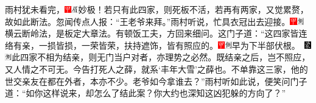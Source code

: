 雨村犹未看完，{\includegraphics[width=3mm]{../Images/00002}\includegraphics[width=3mm]{../Images/00010}\footnotesize \kaishu 妙极！若只有此四家，则死板不活，若再有两家，又觉累赘，故如此断法。}忽闻传点人报：“王老爷来拜。”雨村听说，忙具衣冠出去迎接。{\includegraphics[width=3mm]{../Images/00002}\includegraphics[width=3mm]{../Images/00011}\footnotesize \kaishu 横云断岭法，是板定大章法。}有顿饭工夫，方回来细问。这门子道：“这四家皆连络有亲，一损皆损，一荣皆荣，扶持遮饰，皆有照应的。{{\includegraphics[width=3mm]{../Images/00002}\includegraphics[width=3mm]{../Images/00011}\footnotesize \kaishu 早为下半部伏根。　}\includegraphics[width=3mm]{../Images/00006}\includegraphics[width=3mm]{../Images/00011}\footnotesize \kaishu 此四家不相为结亲，则无门当户对者，亦理势之必然。既结亲之后，岂不照应，又人情之不可无。}今告打死人之薛，就系‘丰年大雪’之薛也。不单靠这三家，他的世交亲友在都在外者，本亦不少。老爷如今拿谁去？”雨村听如此说，便笑问门子道：“如你这样说来，却怎么了结此案？你大约也深知这凶犯躲的方向了？”

